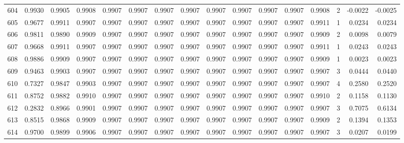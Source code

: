 \begin{tabular}{lrrrrrrrrrrrrrrr}
604 &      0.9930 &  0.9905 &  0.9908 &  0.9907 &  0.9907 &  0.9907 &  0.9907 &  0.9907 &  0.9907 &  0.9907 &   0.9907 &     0.9908 &      2 &                   -0.0022 &                    -0.0025 \\
605 &      0.9677 &  0.9911 &  0.9907 &  0.9907 &  0.9907 &  0.9907 &  0.9907 &  0.9907 &  0.9907 &  0.9907 &   0.9907 &     0.9911 &      1 &                    0.0234 &                     0.0234 \\
606 &      0.9811 &  0.9890 &  0.9909 &  0.9907 &  0.9907 &  0.9907 &  0.9907 &  0.9907 &  0.9907 &  0.9907 &   0.9907 &     0.9909 &      2 &                    0.0098 &                     0.0079 \\
607 &      0.9668 &  0.9911 &  0.9907 &  0.9907 &  0.9907 &  0.9907 &  0.9907 &  0.9907 &  0.9907 &  0.9907 &   0.9907 &     0.9911 &      1 &                    0.0243 &                     0.0243 \\
608 &      0.9886 &  0.9909 &  0.9907 &  0.9907 &  0.9907 &  0.9907 &  0.9907 &  0.9907 &  0.9907 &  0.9907 &   0.9907 &     0.9909 &      1 &                    0.0023 &                     0.0023 \\
609 &      0.9463 &  0.9903 &  0.9907 &  0.9907 &  0.9907 &  0.9907 &  0.9907 &  0.9907 &  0.9907 &  0.9907 &   0.9907 &     0.9907 &      3 &                    0.0444 &                     0.0440 \\
610 &      0.7327 &  0.9847 &  0.9903 &  0.9907 &  0.9907 &  0.9907 &  0.9907 &  0.9907 &  0.9907 &  0.9907 &   0.9907 &     0.9907 &      4 &                    0.2580 &                     0.2520 \\
611 &      0.8752 &  0.9882 &  0.9910 &  0.9907 &  0.9907 &  0.9907 &  0.9907 &  0.9907 &  0.9907 &  0.9907 &   0.9907 &     0.9910 &      2 &                    0.1158 &                     0.1130 \\
612 &      0.2832 &  0.8966 &  0.9901 &  0.9907 &  0.9907 &  0.9907 &  0.9907 &  0.9907 &  0.9907 &  0.9907 &   0.9907 &     0.9907 &      3 &                    0.7075 &                     0.6134 \\
613 &      0.8515 &  0.9868 &  0.9909 &  0.9907 &  0.9907 &  0.9907 &  0.9907 &  0.9907 &  0.9907 &  0.9907 &   0.9907 &     0.9909 &      2 &                    0.1394 &                     0.1353 \\
614 &      0.9700 &  0.9899 &  0.9906 &  0.9907 &  0.9907 &  0.9907 &  0.9907 &  0.9907 &  0.9907 &  0.9907 &   0.9907 &     0.9907 &      3 &                    0.0207 &                     0.0199 \\

\end{tabular}
